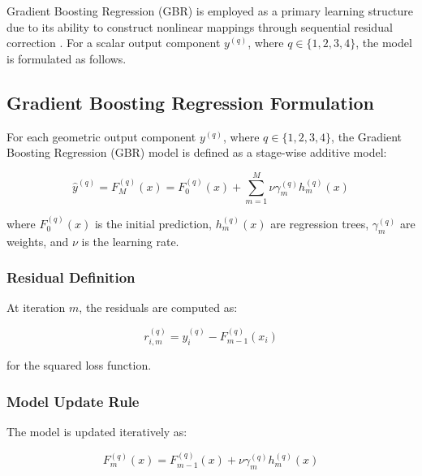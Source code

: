 \documentclass[11pt]{article}
\begin{document}
Gradient Boosting Regression (GBR) is employed as a primary learning structure due to its ability to construct nonlinear mappings through sequential residual correction \cite{Friedman2001}. For a scalar output component $y^{(q)}$, where $q \in \{1,2,3,4\}$, the model is formulated as follows.


\subsection*{Gradient Boosting Regression Formulation}

For each geometric output component $y^{(q)}$, where $q \in \{1,2,3,4\}$, the Gradient Boosting Regression (GBR) model is defined as a stage-wise additive model:

\begin{equation}
\hat{y}^{(q)} = F_M^{(q)}(x) = F_0^{(q)}(x) + \sum_{m=1}^{M} \nu \gamma_m^{(q)} h_m^{(q)}(x)
\end{equation}

where $F_0^{(q)}(x)$ is the initial prediction, $h_m^{(q)}(x)$ are regression trees, $\gamma_m^{(q)}$ are weights, and $\nu$ is the learning rate.


\subsubsection*{Residual Definition}

At iteration $m$, the residuals are computed as:

\begin{equation}
r_{i,m}^{(q)} = y_i^{(q)} - F_{m-1}^{(q)}(x_i)
\end{equation}

for the squared loss function.


\subsubsection*{Model Update Rule}

The model is updated iteratively as:

\begin{equation}
F_m^{(q)}(x) = F_{m-1}^{(q)}(x) + \nu \gamma_m^{(q)} h_m^{(q)}(x)
\end{equation}
\end{document}

